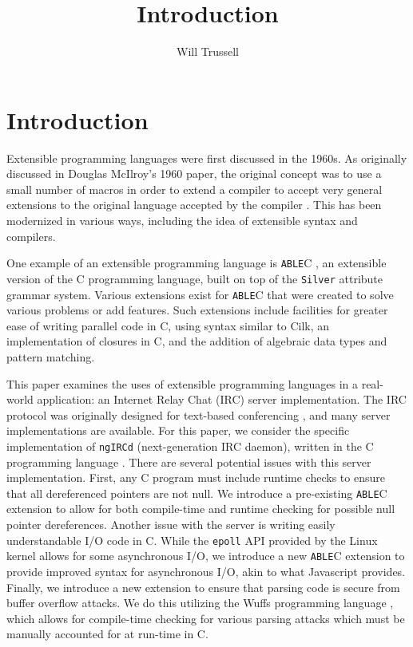 \documentclass[main.tex]{subfiles}
\author{Will Trussell}
\title{Introduction}
\begin{document}
\section{Introduction}

Extensible programming languages were first discussed in the 1960s. As
originally discussed in Douglas McIlroy's 1960 paper, the original concept was
to use a small number of macros in order to extend a compiler to accept very
general extensions to the original language accepted by the compiler 
\cite{6}. This has been modernized in various ways, including the idea
of extensible syntax and compilers.

One example of an extensible programming language is \verb|ABLE|C \cite{9}, 
an extensible version of the C programming language, built on top of the 
\verb|Silver| \cite{3} attribute grammar system. Various extensions exist for 
\verb|ABLE|C that were created to solve various problems or add features. Such
extensions include facilities for greater ease of writing parallel code in C, using syntax
similar to Cilk\cite{2}, an implementation of closures in C, and the addition of algebraic
data types and pattern matching.

This paper examines the uses of extensible programming languages in a real-world
application: an Internet Relay Chat (IRC) server implementation. The IRC
protocol was originally designed for text-based conferencing \cite{7}, and
many server implementations are available. For this paper, we consider the
specific implementation of \verb|ngIRCd| (next-generation IRC daemon), written 
in the C programming language \cite{1}. There are several potential issues with this 
server implementation. First, any C program must include runtime checks to 
ensure that all dereferenced pointers are not null. We introduce a pre-existing \verb|ABLE|C extension to 
allow for both compile-time and runtime checking for possible null pointer dereferences.  Another 
issue with the server is writing easily understandable I/O code in C. While the 
\verb|epoll| API provided by the Linux kernel allows for some asynchronous I/O, 
we introduce a new \verb|ABLE|C extension to provide improved syntax for 
asynchronous I/O, akin to what Javascript provides. Finally, we introduce a new 
extension to ensure that parsing code is secure from buffer overflow attacks. We do this utilizing the Wuffs 
programming language \cite{5}, which allows for compile-time checking for various 
parsing attacks which must be manually accounted for at run-time in C.
\end{document}
